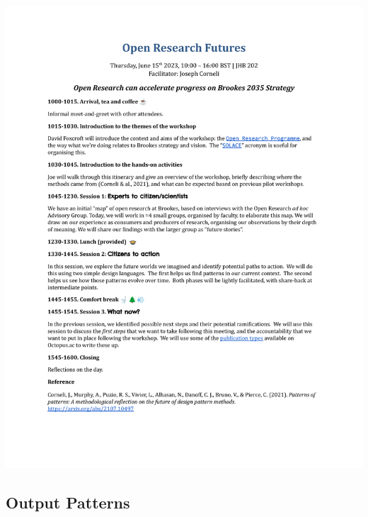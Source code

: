 \documentclass[acmlarge,timestamp]{acmart}
\begin{document}
\begin{mdframed}[backgroundcolor=blue!50,linecolor=blue!50]
  \noindent\includegraphics[width=\textwidth,trim={1cm 5.5cm 1cm 4.5cm},clip=true]{brookes}
\end{mdframed}

\clearpage

\subsection{Output Patterns}
\end{document}
